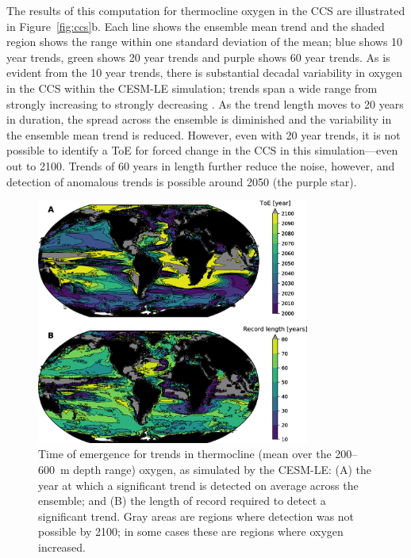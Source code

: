 \documentclass{report_chapter}
\begin{document}
The results of this computation for thermocline oxygen in the CCS are illustrated in Figure~\ref{fig:ccs}b.
Each line shows the ensemble mean trend and the shaded region shows the range within one standard deviation of the mean; blue shows 10 year trends, green shows 20 year trends and purple shows 60 year trends.
As is evident from the 10 year trends, there is substantial decadal variability in oxygen in the CCS within the CESM-LE simulation; trends span a wide range from strongly increasing to strongly decreasing \OO{}.
As the trend length moves to 20 years in duration, the spread across the ensemble is diminished and the variability in the ensemble mean trend is reduced.
However, even with 20 year trends, it is not possible to identify a ToE for forced \OO{} change in the CCS in this simulation---even out to 2100.
Trends of 60 years in length further reduce the noise, however, and detection of anomalous trends is possible around 2050 (the purple star).

\begin{figure}[tbp]
\centering
\includegraphics[width=0.8\textwidth]{cesm-toe.png}
\caption{Time of emergence for trends in thermocline (mean over the 200--600~m depth range) oxygen, as simulated by the CESM-LE: (A) the year at which a significant trend is detected on average across the ensemble; and (B) the length of record required to detect a significant trend.
Gray areas are regions where detection was not possible by 2100; in some cases these are regions where oxygen increased.}
\label{fig:cesm-toe}
\end{figure}
\end{document}
